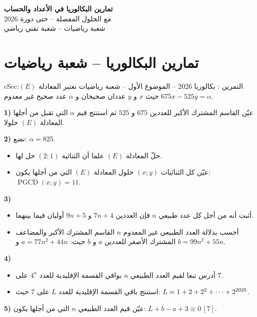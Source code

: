 \documentclass[12pt,a4paper]{article}
\newenvironment{BOX}[2]{\begin{otherlanguage}{english}\begin{arbox}{#1}{#2}}{\end{arbox}\end{otherlanguage}}
\newcounter{exo}
\newenvironment{tamrin}[1]{\stepcounter{exo}\begin{BOX}{cSec}{التمرين \theexo: #1}}{\end{BOX}}
\newenvironment{LTR}{\begin{otherlanguage}{english}}{\end{otherlanguage}}
\renewcommand{\cdots}{\mathinner{\cdotp\cdotp\cdotp}}
\newcommand{\pgcd}{\operatorname{PGCD}}
\newenvironment{sq}{\begin{itemize}[leftmargin=2.4em,itemsep=3pt]}{\end{itemize}}
\newcommand{\qa}{\item[(أ)]}\newcommand{\qb}{\item[(ب)]}\newcommand{\qc}{\item[(جـ)]}\newcommand{\qd}{\item[(د)]}\newcommand{\qe}{\item[(هـ)]}
\begin{document}
\begin{LTR}
\begin{tcolorbox}[enhanced,colback=cSec,colframe=cSec,arc=3mm,halign=center,boxrule=0pt,top=12pt,bottom=12pt,before upper={\selectlanguage{arabic}}]
{\color{white}\fontsize{26}{32}\selectfont\bfseries تمارين البكالوريا في الأعداد والحساب}\\[8pt]
{\color{white}\large مع الحلول المفصلة -- حتى دورة 2026}\\[5pt]
{\color{white}\large شعبة رياضيات -- شعبة تقني رياضي}
\end{tcolorbox}
\end{LTR}
\section{تمارين البكالوريا -- شعبة رياضيات}
\begin{tamrin}{بكالوريا 2026 -- الموضوع الأول -- شعبة رياضيات}
نعتبر المعادلة $(E)$: \quad $675x-525y=\alpha$ حيث $x$ و $y$ عددان صحيحان و $\alpha$ عدد صحيح غير معدوم.

\textbf{1)} عيّن القاسم المشترك الأكبر للعددين $675$ و $525$ ثم استنتج قيم $\alpha$ التي تقبل من أجلها المعادلة $(E)$ حلولا.

\textbf{2)} نضع: $\alpha=825$.
\begin{sq}
\qa حلّ المعادلة $(E)$ علما أن الثنائية $(2;1)$ حل لها.
\qb عيّن كل الثنائيات $(x;y)$ حلول المعادلة $(E)$ التي من أجلها يكون: $\pgcd(x;y)=11$.
\end{sq}
\textbf{3)}
\begin{sq}
\qa أثبت أنه من أجل كل عدد طبيعي $n$ فإن العددين $7n+4$ و $9n+5$ أوليان فيما بينهما.
\qb أحسب بدلالة العدد الطبيعي غير المعدوم $n$ القاسم المشترك الأكبر والمضاعف المشترك الأصغر للعددين $a$ و $b$ حيث: $a=77n^2+44n$ و $b=99n^2+55n$.
\end{sq}
\textbf{4)}
\begin{sq}
\qa أدرس تبعا لقيم العدد الطبيعي $n$ بواقي القسمة الإقليدية للعدد $4^n$ على $7$.
\qb استنتج باقي القسمة الإقليدية للعدد $L$ على $7$ حيث: $L=1+2+2^2+\cdots+2^{2025}$.
\end{sq}
\textbf{5)} عيّن قيم العدد الطبيعي $n$ التي من أجلها يكون: $L+b-a+3\equiv 0\,[7]$.
\end{tamrin}
\end{document}
